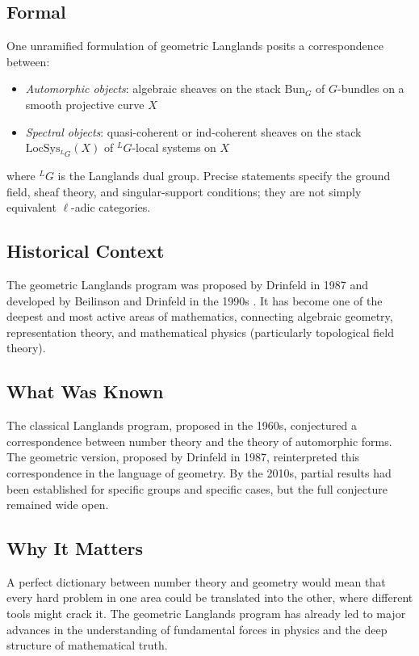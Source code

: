 \subsection{Formal}
One unramified formulation of geometric Langlands posits a correspondence between:
\begin{itemize}
\item \emph{Automorphic objects}: algebraic sheaves on the stack $\mathrm{Bun}_G$ of $G$-bundles on a smooth projective curve $X$
\item \emph{Spectral objects}: quasi-coherent or ind-coherent sheaves on the stack $\mathrm{LocSys}_{^L G}(X)$ of $^L G$-local systems on $X$
\end{itemize}
where $^L G$ is the Langlands dual group. Precise statements specify the ground field, sheaf theory, and singular-support conditions; they are not simply equivalent $\ell$-adic categories.

\subsection{Historical Context}
The geometric Langlands program was proposed by Drinfeld in 1987 and developed by Beilinson and Drinfeld in the 1990s \cite{drinfeld1987, beilinson2004}. It has become one of the deepest and most active areas of mathematics, connecting algebraic geometry, representation theory, and mathematical physics (particularly topological field theory).

\subsection{What Was Known}
The classical Langlands program, proposed in the 1960s, conjectured a correspondence between number theory and the theory of automorphic forms. The geometric version, proposed by Drinfeld in 1987, reinterpreted this correspondence in the language of geometry. By the 2010s, partial results had been established for specific groups and specific cases, but the full conjecture remained wide open.

\subsection{Why It Matters}
A perfect dictionary between number theory and geometry would mean that every hard problem in one area could be translated into the other, where different tools might crack it. The geometric Langlands program has already led to major advances in the understanding of fundamental forces in physics and the deep structure of mathematical truth.


